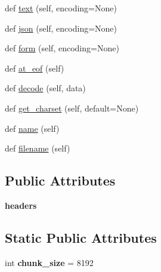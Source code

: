 \begin{DoxyCompactItemize}
\item 
def \hyperlink{classaiohttp_1_1multipart_1_1_body_part_reader_a96751ec0eae97861585e2596c361fcb8}{text} (self, encoding=None)
\item 
def \hyperlink{classaiohttp_1_1multipart_1_1_body_part_reader_a3ad9b8805390d178867f0cb763e701fb}{json} (self, encoding=None)
\item 
def \hyperlink{classaiohttp_1_1multipart_1_1_body_part_reader_a313d11c2b068df4d8b9fc060d0208315}{form} (self, encoding=None)
\item 
def \hyperlink{classaiohttp_1_1multipart_1_1_body_part_reader_a96ff9ae3bebde19124b072ec74ba8b34}{at\+\_\+eof} (self)
\item 
def \hyperlink{classaiohttp_1_1multipart_1_1_body_part_reader_a97f00c080c7c84423636e182e7638706}{decode} (self, data)
\item 
def \hyperlink{classaiohttp_1_1multipart_1_1_body_part_reader_a825fe9661760b578e1ab94bd463ce220}{get\+\_\+charset} (self, default=None)
\item 
def \hyperlink{classaiohttp_1_1multipart_1_1_body_part_reader_ab983ea22d799778976dc13a4a2a38bf3}{name} (self)
\item 
def \hyperlink{classaiohttp_1_1multipart_1_1_body_part_reader_afd42076ef9080ce98dc423bc66fa0dc0}{filename} (self)
\end{DoxyCompactItemize}
\subsection*{Public Attributes}
\begin{DoxyCompactItemize}
\item 
\mbox{\label{classaiohttp_1_1multipart_1_1_body_part_reader_a30eb4fc23e02993774e1b4da37286c01}} 
{\bfseries headers}
\end{DoxyCompactItemize}
\subsection*{Static Public Attributes}
\begin{DoxyCompactItemize}
\item 
\mbox{\label{classaiohttp_1_1multipart_1_1_body_part_reader_a0c8115576621ad840edb3ea75d1ff4fa}} 
int {\bfseries chunk\+\_\+size} = 8192
\end{DoxyCompactItemize}


